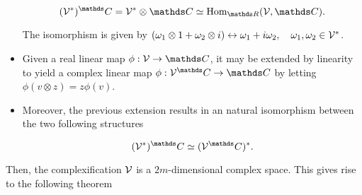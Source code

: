 \begin{remark}
\begin{itemize}
        $$
            (\vectorspace^{*})^\C = {\vectorspace^{*}} \otimes \C \simeq \textnormal{Hom}_{\R}(\vectorspace, \C).
        $$
        
        The isomorphism is given by $(\omega_1 \otimes 1 + \omega_2 \otimes i) \leftrightarrow \omega_1 + i\omega_2, \quad \omega_1, \omega_2 \in \mathcal{V}^{*}$. 
        
        \item Given a real linear map $\phi : \vectorspace \rightarrow \C$, it may be extended by linearity to yield a complex linear map $\phi: \vectorspace^\C \rightarrow \C$ by letting $\phi(v \otimes z) = z \phi(v)$. 
        
        \item Moreover, the previous extension results in an natural isomorphism between the two following structures
        
        \begin{equation*}
            (\vectorspace^{*})^\C \simeq (\vectorspace^\C)^{*}. 
        \end{equation*}
    \end{itemize}
    
\end{remark}

\blanky \bigbreak

Then, the complexification $\mathcal{V}$ is a $2m$-dimensional complex space. This gives rise to the following theorem

